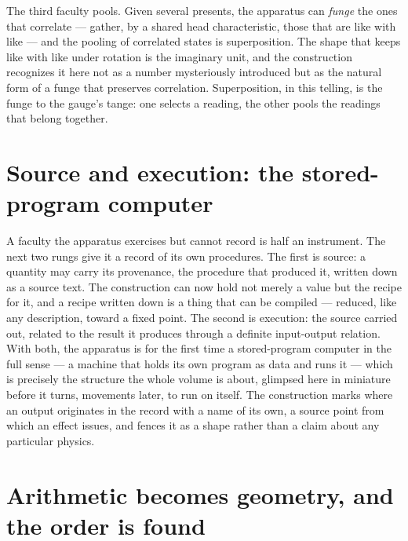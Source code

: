 The third faculty pools. Given several presents, the apparatus can \emph{funge} the ones that correlate ---
gather, by a shared head characteristic, those that are like with like --- and the pooling of correlated
states is superposition. The shape that keeps like with like under rotation is the imaginary unit, and the
construction recognizes it here not as a number mysteriously introduced but as the natural form of a funge
that preserves correlation. Superposition, in this telling, is the funge to the gauge's tange: one selects
a reading, the other pools the readings that belong together.

\section{Source and execution: the stored-program computer}
\label{se:source-execution}

A faculty the apparatus exercises but cannot record is half an instrument. The next two rungs give it a
record of its own procedures. The first is source: a quantity may carry its provenance, the procedure that
produced it, written down as a source text. The construction can now hold not merely a value but the
recipe for it, and a recipe written down is a thing that can be compiled --- reduced, like any description,
toward a fixed point. The second is execution: the source carried out, related to the result it produces
through a definite input-output relation. With both, the apparatus is for the first time a stored-program
computer in the full sense --- a machine that holds its own program as data and runs it --- which is
precisely the structure the whole volume is about, glimpsed here in miniature before it turns, movements
later, to run on itself. The construction marks where an output originates in the record with a name of its
own, a source point from which an effect issues, and fences it as a shape rather than a claim about any
particular physics.

\section{Arithmetic becomes geometry, and the order is found}
\label{se:arithmetic-geometry-order}

